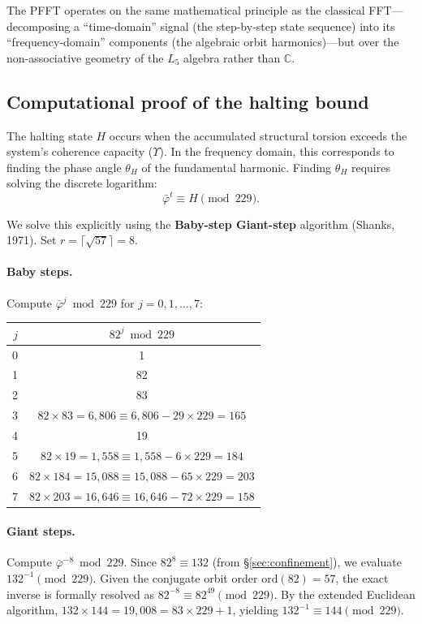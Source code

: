 The PFFT operates on the same mathematical principle as the
classical FFT---decomposing a ``time-domain'' signal (the step-by-step
state sequence) into its ``frequency-domain'' components (the
algebraic orbit harmonics)---but over the non-associative geometry
of the $L_5$ algebra rather than $\mathbb{C}$.

\subsection{Computational proof of the halting bound}

The halting state $H$ occurs when the accumulated structural
torsion exceeds the system's coherence capacity ($\Upsilon$).
In the frequency domain, this corresponds to finding the phase
angle $\theta_H$ of the fundamental harmonic. Finding $\theta_H$
requires solving the discrete logarithm:
\[
\bar\varphi^t \equiv H \pmod{229}.
\]

We solve this explicitly using the \textbf{Baby-step Giant-step}
algorithm (Shanks, 1971). Set $r = \lceil\sqrt{57}\rceil = 8$.

\paragraph{Baby steps.} Compute $\bar\varphi^j \bmod 229$ for
$j = 0, 1, \ldots, 7$:

\begin{center}
\begin{tabular}{@{}rc@{}}
\toprule
$j$ & $82^j \bmod 229$ \\
\midrule
0 & 1 \\
1 & 82 \\
2 & 83 \\
3 & $82 \times 83 = 6{,}806 \equiv 6{,}806 - 29 \times 229 = 165$ \\
4 & 19 \\
5 & $82 \times 19 = 1{,}558 \equiv 1{,}558 - 6 \times 229 = 184$ \\
6 & $82 \times 184 = 15{,}088 \equiv 15{,}088 - 65 \times 229 = 203$ \\
7 & $82 \times 203 = 16{,}646 \equiv 16{,}646 - 72 \times 229 = 158$ \\
\bottomrule
\end{tabular}
\end{center}

\paragraph{Giant steps.} Compute $\bar\varphi^{-8} \bmod 229$.
Since $82^8 \equiv 132$ (from \S\ref{sec:confinement}), we evaluate
$132^{-1} \pmod{229}$. Given the conjugate orbit order $\mathrm{ord}(82) = 57$,
the exact inverse is formally resolved as $82^{-8} \equiv 82^{49} \pmod{229}$.
By the extended Euclidean algorithm, $132 \times 144 = 19{,}008 = 83 \times 229 + 1$,
yielding $132^{-1} \equiv 144 \pmod{229}$.

